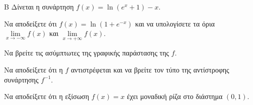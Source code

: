 \begin{thema}{Β}
Δίνεται η συνάρτηση $f(x) = \ln(e^x + 1) - x$.
\begin{erwthma}
\item Να αποδείξετε ότι $f(x) = \ln(1 + e^{-x})$ και να υπολογίσετε τα όρια $\lim\limits_{x \to -\infty} f(x)$ και $\lim\limits_{x \to +\infty} f(x)$.
\item Να βρείτε τις ασύμπτωτες της γραφικής παράστασης της $f$.
\item Να αποδείξετε ότι η $f$ αντιστρέφεται και να βρείτε τον τύπο της αντίστροφης συνάρτησης $f^{-1}$.
\item Να αποδείξετε ότι η εξίσωση $f(x) = x$ έχει μοναδική ρίζα στο διάστημα $(0, 1)$.
\end{erwthma}
\end{thema}
